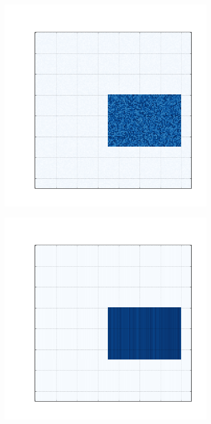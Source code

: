 \documentclass[10pt]{beamer}
\begin{document}
\begin{frame}
  \begin{figure}[H]
  \centering
      \begin{subfigure}[b]{0.13\textwidth}
          \includegraphics[width=\textwidth]{img/a-bic-structure.png}
      \end{subfigure}
      \begin{subfigure}[b]{0.13\textwidth}
          \includegraphics[width=\textwidth]{img/a-reconstruction-kmeans.png}

\end{subfigure}
\end{figure}
\end{frame}
\end{document}
